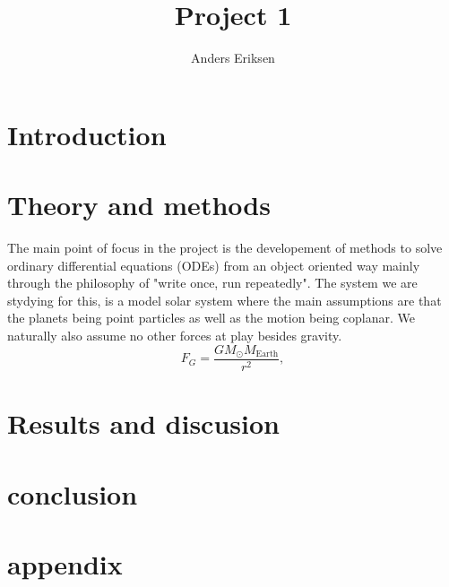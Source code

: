 \documentclass[10pt, twocolumn]{revtex4-1}
\begin{document}
\title{Project 1}
\author{Anders Eriksen}
\maketitle


\section{Introduction}

\section{Theory and methods}

The main point of focus in the project is the developement of methods to
solve ordinary differential equations (ODEs) from an object oriented way
mainly through the philosophy of "write once, run repeatedly". The system
we are stydying for this, is a model solar system where the main assumptions
are that the planets being point particles as well as the motion being coplanar. 
We naturally also assume no other forces at play besides gravity. 
\[
F_G=\frac{GM_{\odot}M_{\mathrm{Earth}}}{r^2},
\]


\section{Results and discusion}

\section{conclusion}

\section{appendix}


\end{document}
